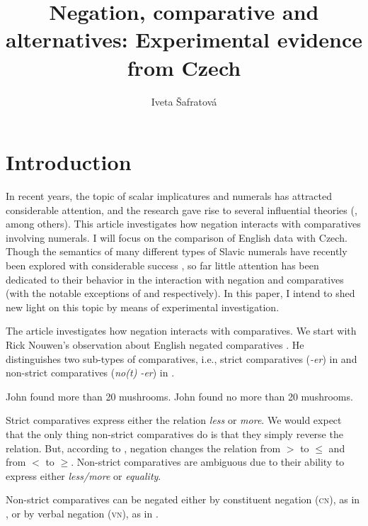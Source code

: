 \documentclass[output=paper,
]{langscibook}
\title{Negation, comparative and alternatives: Experimental evidence from Czech}
\author{
Iveta Šafratová\affiliation{Masaryk University in Brno}
}
\begin{document}
\maketitle


\section{Introduction} 

In recent years, the topic of scalar implicatures and numerals has attracted considerable attention, and the research gave rise to several influential theories (\citealt{larson1988scope,krifka1999least,sauerland2004scalar,fox2006universal}, among others). This article investigates how negation interacts with comparatives involving numerals. I will focus on the comparison of English data with Czech. Though the semantics of many different types of Slavic numerals have recently been explored with considerable success  \citep[e.g.][]{docekal2013numerals,wagiel2014boys,wagiel2015sums}, so far little attention has been dedicated to their behavior in the interaction with negation and comparatives (with the notable exceptions of \citealt{dovcekal2017upper} and \citealt{docekal_wagiel2018event} respectively). In this paper, I intend to shed new light on this topic by means of experimental investigation.

The article investigates how negation interacts with comparatives. We start with Rick Nouwen's observation about English negated comparatives \citep{nouwen2008upper}. He distinguishes two sub-types of comparatives, i.e., strict comparatives (\textit{-er}) in  and non-strict comparatives (\textit{no(t) -er}) in . 
	
\ea \ea John found more than 20 mushrooms.\label{ex:mush}
\ex John found no more than 20 mushrooms.\label{ex:no_mush}
\z
\z

\noindent Strict comparatives express either the relation \textit{less} or \textit{more}. We would expect that the only thing non-strict comparatives do is that they simply reverse the relation. 
But, according to \cite{nouwen2008upper}, negation
changes the relation from $>$ to $\leq$ and from $<$ to $\geq$. Non-strict comparatives are ambiguous due to
their ability to express either \textit{less/more} or \textit{equality}. 

Non-strict comparatives can be negated either by constituent negation (\textsc{cn}), as in , or by verbal negation (\textsc{vn}), as in .
\end{document}

